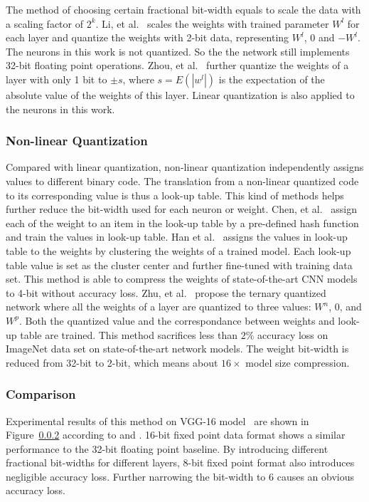 The method of choosing certain fractional bit-width equals to scale the data with a scaling factor of $2^k$. Li, et al.~\cite{li2016ternary} scales the weights with trained parameter $W^l$ for each layer and quantize the weights with 2-bit data, representing $W^l$, 0 and $-W^l$. The neurons in this work is not quantized. So the the network still implements 32-bit floating point operations. Zhou, et al.~\cite{zhou2016dorefa} further quantize the weights of a layer with only 1 bit to $\pm s$, where $s=E(|w^l|)$ is the expectation of the absolute value of the weights of this layer. Linear quantization is also applied to the neurons in this work.

\subsubsection{Non-linear Quantization}
Compared with linear quantization, non-linear quantization independently assigns values to different binary code. The translation from a non-linear quantized code to its corresponding value is thus a look-up table. This kind of methods helps further reduce the bit-width used for each neuron or weight. Chen, et al.~\cite{chen2015compressing} assign each of the weight to an item in the look-up table by a pre-defined hash function and train the values in look-up table. Han et al.~\cite{han2015deep} assigns the values in look-up table to the weights by clustering the weights of a trained model. Each look-up table value is set as the cluster center and further fine-tuned with training data set. This method is able to compress the weights of state-of-the-art CNN models to 4-bit without accuracy loss. Zhu, et al.~\cite{zhu2016trained} propose the ternary quantized network where all the weights of a layer are quantized to three values: $W^n$, 0, and $W^p$. Both the quantized value and the correspondance between weights and look-up table are trained. This method sacrifices less than $2\%$ accuracy loss on ImageNet data set on state-of-the-art network models. The weight bit-width is reduced from 32-bit to 2-bit, which means about $16\times$ model size compression.

\subsubsection{Comparison}
Experimental results of this method on VGG-16 model~\cite{simonyan2014very} are shown in Figure~\ref{} according to \cite{qiu2016going} and \cite{guo2017angel}. 16-bit fixed point data format shows a similar performance to the 32-bit floating point baseline. By introducing different fractional bit-widths for different layers, 8-bit fixed point format also introduces negligible accuracy loss. Further narrowing the bit-width to 6 causes an obvious accuracy loss.

